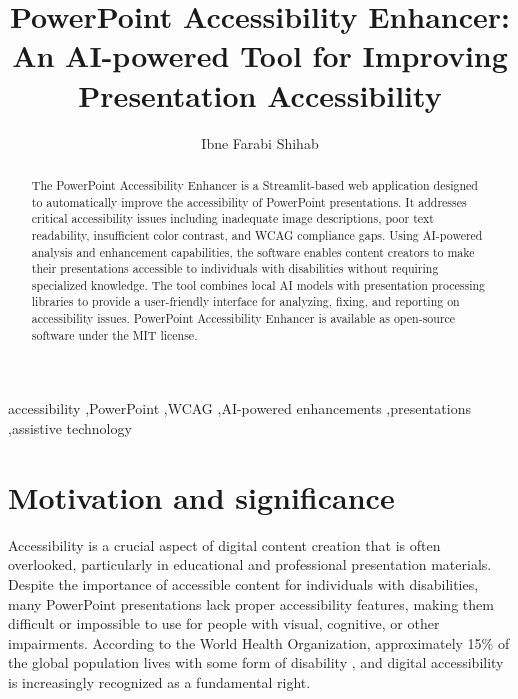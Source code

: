 \documentclass[preprint,review,12pt]{elsarticle} %
\begin{document}
\begin{frontmatter}

\title{PowerPoint Accessibility Enhancer: An AI-powered Tool for Improving Presentation Accessibility}

\author[1]{Ibne Farabi Shihab}

\address[1]{Department of Computer Science,Iowa State University, Ames, USA}

\begin{abstract}
The PowerPoint Accessibility Enhancer is a Streamlit-based web application designed to automatically improve the accessibility of PowerPoint presentations. It addresses critical accessibility issues including inadequate image descriptions, poor text readability, insufficient color contrast, and WCAG compliance gaps. Using AI-powered analysis and enhancement capabilities, the software enables content creators to make their presentations accessible to individuals with disabilities without requiring specialized knowledge. The tool combines local AI models with presentation processing libraries to provide a user-friendly interface for analyzing, fixing, and reporting on accessibility issues. PowerPoint Accessibility Enhancer is available as open-source software under the MIT license.
\end{abstract}

\begin{keyword}
accessibility \sep PowerPoint \sep WCAG \sep AI-powered enhancements \sep presentations \sep assistive technology
\end{keyword}
\end{frontmatter}

\section{Motivation and significance}
Accessibility is a crucial aspect of digital content creation that is often overlooked, particularly in educational and professional presentation materials. Despite the importance of accessible content for individuals with disabilities, many PowerPoint presentations lack proper accessibility features, making them difficult or impossible to use for people with visual, cognitive, or other impairments. According to the World Health Organization, approximately 15\% of the global population lives with some form of disability \cite{who}, and digital accessibility is increasingly recognized as a fundamental right.
\end{document}
